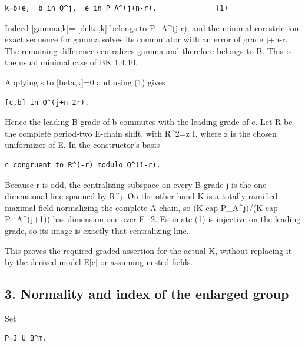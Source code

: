 \begin{Verbatim}[fontsize=\small,breaklines=true,breakanywhere=true]
k=b+e,  b in Q^j,  e in P_A^(j+n-r).              (1)
\end{Verbatim}

Indeed {[}gamma,k{]}=-{[}delta,k{]} belongs to P\_A\^{}(j-r), and the
minimal corestriction exact sequence for gamma solves its commutator
with an error of grade j+n-r. The remaining difference centralizes gamma
and therefore belongs to B. This is the usual minimal case of BK 1.4.10.

Applying s to {[}beta,k{]}=0 and using (1) gives

\begin{Verbatim}[fontsize=\small,breaklines=true,breakanywhere=true]
[c,b] in Q^(j+n-2r).
\end{Verbatim}

Hence the leading B-grade of b commutes with the leading grade of c. Let
R be the complete period-two E-chain shift, with R\^{}2=z I, where z is
the chosen uniformizer of E. In the constructor's basis

\begin{Verbatim}[fontsize=\small,breaklines=true,breakanywhere=true]
c congruent to R^(-r) modulo Q^(1-r).
\end{Verbatim}

Because r is odd, the centralizing subspace on every B-grade j is the
one-dimensional line spanned by R\^{}j. On the other hand K is a totally
ramified maximal field normalizing the complete A-chain, so (K cap
P\_A\^{}j)/(K cap P\_A\^{}(j+1)) has dimension one over F\_2. Estimate
(1) is injective on the leading grade, so its image is exactly that
centralizing line.

This proves the required graded assertion for the actual K, without
replacing it by the derived model E{[}c{]} or assuming nested fields.

\hypertarget{rank4-normality-and-index-of-the-enlarged-group}{%
\subsection{3. Normality and index of the enlarged
group}\label{rank4-normality-and-index-of-the-enlarged-group}}

Set

\begin{Verbatim}[fontsize=\small,breaklines=true,breakanywhere=true]
P=J U_B^m.
\end{Verbatim}

